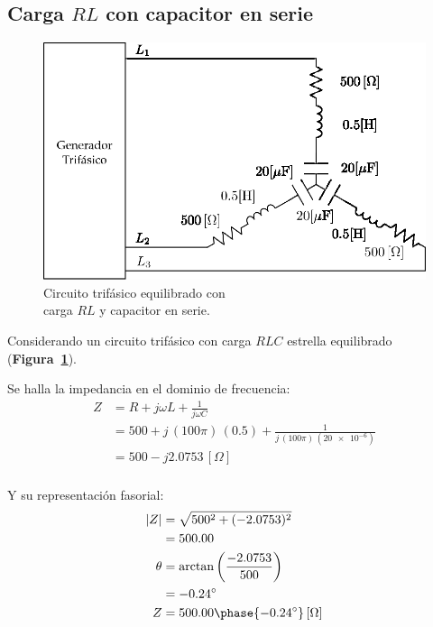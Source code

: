 \documentclass[letter,11pt]{article}
\begin{document}
\subsection{Carga $RL$ con capacitor en serie}
\begin{figure}[!h]
\centering
\includegraphics[scale=1]{figura2.eps}
\caption{Circuito trifásico equilibrado con \\carga $RL$ y capacitor en serie.}
\label{circuito2}
\end{figure}

Considerando un circuito trifásico con carga $RLC$ estrella equilibrado
(\textbf{Figura~\ref{circuito2}}).

Se halla la impedancia en el dominio de frecuencia:
\begin{equation*}
    \begin{split}
        Z &= R+j\omega L+\frac{1}{j\omega C}\\
          &= 500+j\,(100\pi)\,(0.5)+\frac{1}{j\,(100\pi)\,(\num{20e-6})}\\
          &= 500-j2.0753\,[\Omega]\\
    \end{split}
\end{equation*}

Y su representación fasorial:
\begin{equation*}
    \begin{split}
        |Z| &= \sqrt{500^2+(-2.0753)^2}\\
            &= 500.00\\
        \theta &= \arctan\left(\frac{-2.0753}{500}\right)\\
               &= -0.24^{\circ}\\
        Z &= 500.00\phase{-0.24^{\circ}}\,[\Omega]\\
    \end{split}
\end{equation*}
\end{document}
